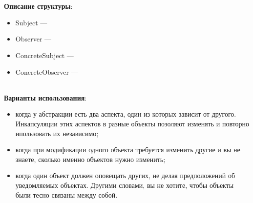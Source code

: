 \documentclass[a3paper,11pt]{report}
\def \boxSize {7cm}
\newcommand{\umlnoteND}[6]{
	\node[umlcd style, anchor=north, draw, shape=umlcdnote, text width=#2] at (#1) (note) {#3};
	\draw [umlcd style dashed line , ] (note.#4) ++(#5) --++(#6) coordinate(tmp) node[circle,inner sep=0pt,draw, fill=black!1, minimum size=5pt] (NoD) { };
}
\begin{document}
\\\\
\textbf{Описание структуры}:
\begin{itemize}
\item Subject ---
\item Observer ---
\item ConcreteSubject ---
\item ConcreteObserver ---
\end{itemize}
\large\textbf{\\Варианты использования}:
\begin{itemize}
\item когда у абстракции есть два аспекта, один из которых зависит от другого. Инкапсуляции этих аспектов в разные объекты позоляют изменять и повторно ипользовать их независимо;
\item когда при модификации одного объекта требуется изменить другие и вы не знаете, сколько именно объектов нужно изменить;
\item когда один объект должен оповещать других, не делая предположений об уведомляемых объектах. Другими словами, вы не хотите, чтобы объекты были тесно связаны между собой.
\end{itemize}
\end{document}

